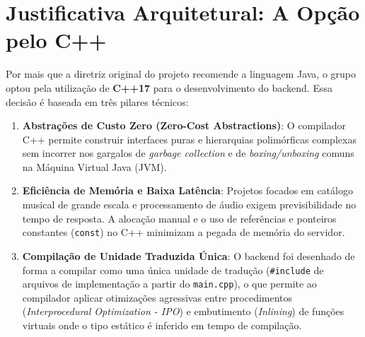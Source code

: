 \documentclass[12pt,a4paper]{article}
\begin{document}
\section{Justificativa Arquitetural: A Opção pelo C++}
Por mais que a diretriz original do projeto recomende a linguagem Java, o grupo optou pela utilização de \textbf{C++17} para o desenvolvimento do backend. Essa decisão é baseada em três pilares técnicos:
\begin{enumerate}
    \item \textbf{Abstrações de Custo Zero (Zero-Cost Abstractions)}: O compilador C++ permite construir interfaces puras e hierarquias polimórficas complexas sem incorrer nos gargalos de \textit{garbage collection} e de \textit{boxing/unboxing} comuns na Máquina Virtual Java (JVM).
    \item \textbf{Eficiência de Memória e Baixa Latência}: Projetos focados em catálogo musical de grande escala e processamento de áudio exigem previsibilidade no tempo de resposta. A alocação manual e o uso de referências e ponteiros constantes (\texttt{const}) no C++ minimizam a pegada de memória do servidor.
    \item \textbf{Compilação de Unidade Traduzida Única}: O backend foi desenhado de forma a compilar como uma única unidade de tradução (\texttt{\#include} de arquivos de implementação a partir do \texttt{main.cpp}), o que permite ao compilador aplicar otimizações agressivas entre procedimentos (\textit{Interprocedural Optimization - IPO}) e embutimento (\textit{Inlining}) de funções virtuais onde o tipo estático é inferido em tempo de compilação.
\end{enumerate}
\end{document}

